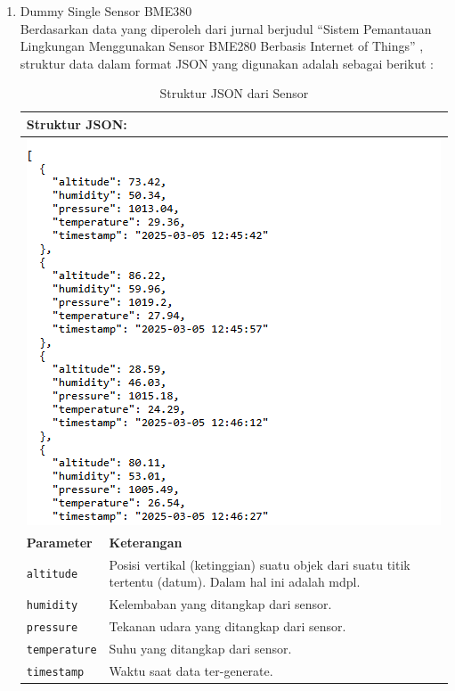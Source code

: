 \begin{enumerate}[label={\alph*.}]
	\item Dummy Single Sensor BME380 \\
	Berdasarkan data yang diperoleh dari jurnal berjudul “Sistem Pemantauan Lingkungan Menggunakan Sensor BME280 Berbasis Internet of Things” \cite{Triawan2023}, struktur data dalam format JSON yang digunakan adalah sebagai berikut : 
	\pagebreak
	
	\begin{longtable}{|p{.35\linewidth}|p{.60\linewidth}|}
		\caption{Struktur JSON dari Sensor}
		\label{tab:json_sensor} \\  
		\hline
		\multicolumn{2}{|l|}{\textbf{Struktur JSON:}} \\ \hline
		\multicolumn{2}{|c|}{%
			\includegraphics[width=0.8\linewidth, margin=5pt 10pt 5pt 10pt ]{gambar/Metodologi/StrukturJson.png}
		} \\ \hline
		\textbf{Parameter} & \textbf{Keterangan} \\ \hline
		\texttt{altitude} & Posisi vertikal (ketinggian) suatu objek dari suatu titik tertentu (datum). Dalam hal ini adalah mdpl. \\ \hline
		\texttt{humidity} & Kelembaban yang ditangkap dari sensor. \\ \hline
		\texttt{pressure} & Tekanan udara yang ditangkap dari sensor. \\ \hline
		\texttt{temperature} & Suhu yang ditangkap dari sensor. \\ \hline
		\texttt{timestamp} & Waktu saat data ter-generate. \\ \hline
	\end{longtable}
	

\end{enumerate}
